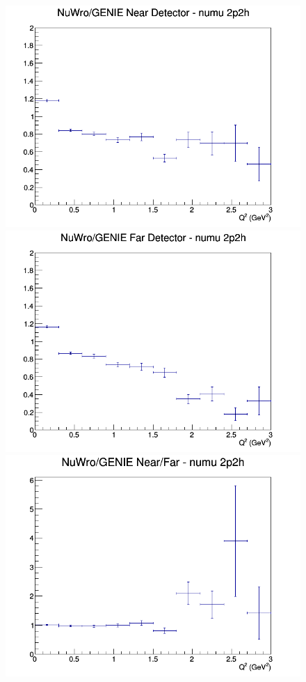 \begin{figure}[h]
\endminipage
\newline
{}
\includegraphics[width=\linewidth]{eff_Q2/LAr/ratios/2p2h_NuWro_GENIE_numu_near_Q2.png}
\endminipage
{}
\includegraphics[width=\linewidth]{eff_Q2/LAr/ratios/2p2h_NuWro_GENIE_numu_far_Q2.png}
\endminipage
{}
\includegraphics[width=\linewidth]{eff_Q2/LAr/ratios/2p2h_NuWro_GENIE_numu_NF_Q2.png}
\endminipage
\newline
\end{figure}
\clearpage
